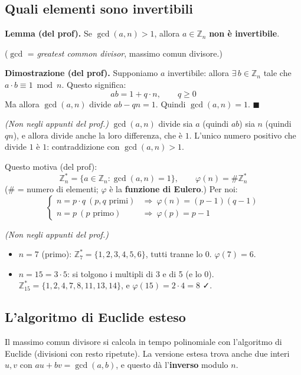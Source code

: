 \subsection{Quali elementi sono invertibili}

\textbf{Lemma (del prof).} Se \(\gcd(a, n) > 1\), allora \(a \in \mathbb{Z}_n\) \textbf{non è invertibile}.

(\(\gcd\) = \emph{greatest common divisor}, massimo comun divisore.)

\textbf{Dimostrazione (del prof).} Supponiamo \(a\) invertibile: allora \(\exists\, b \in \mathbb{Z}_n\) tale che \(a \cdot b \equiv 1 \bmod n\). Questo significa:
\[
ab = 1 + q \cdot n, \qquad q \ge 0
\]
Ma allora \(\gcd(a, n)\) divide \(ab - qn = 1\). Quindi \(\gcd(a, n) = 1\). \(\blacksquare\)

\emph{(Non negli appunti del prof.)} \(\gcd(a, n)\) divide sia \(a\) (quindi \(ab\)) sia \(n\) (quindi \(qn\)), e allora divide anche la loro differenza, che è \(1\). L'unico numero positivo che divide \(1\) è \(1\): contraddizione con \(\gcd(a, n) > 1\).

Questo motiva (del prof):
\[
\mathbb{Z}_n^* = \{a \in \mathbb{Z}_n : \gcd(a, n) = 1\}, \qquad \varphi(n) = \# \mathbb{Z}_n^*
\]
(\(\#\) = numero di elementi; \(\varphi\) è la \textbf{funzione di Eulero}.) Per noi:
\[
\begin{cases}
n = p \cdot q \ (p, q \text{ primi}) & \Rightarrow\ \varphi(n) = (p-1)(q-1) \\
n = p \ (p \text{ primo}) & \Rightarrow\ \varphi(p) = p - 1
\end{cases}
\]

\begin{esempio}
\emph{(Non negli appunti del prof.)}
\begin{itemize}
  \item \(n = 7\) (primo): \(\mathbb{Z}_7^* = \{1, 2, 3, 4, 5, 6\}\), tutti tranne lo \(0\). \(\varphi(7) = 6\).
  \item \(n = 15 = 3 \cdot 5\): si tolgono i multipli di 3 e di 5 (e lo 0). \(\mathbb{Z}_{15}^* = \{1, 2, 4, 7, 8, 11, 13, 14\}\), e \(\varphi(15) = 2 \cdot 4 = 8\) ✓.
\end{itemize}
\end{esempio}

\subsection{L'algoritmo di Euclide esteso}

\begin{inbreve}
Il massimo comun divisore si calcola in tempo polinomiale con l'algoritmo di Euclide (divisioni con resto ripetute). La versione estesa trova anche due interi \(u, v\) con \(au + bv = \gcd(a, b)\), e questo dà l'\textbf{inverso} modulo \(n\).
\end{inbreve}

